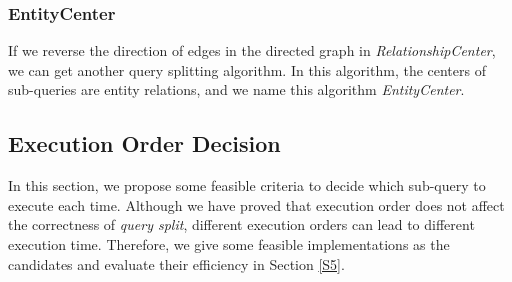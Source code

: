     
    \subsubsection{EntityCenter} \label{S413}
        If we reverse the direction of edges in the directed graph in \textit{RelationshipCenter}, we can get another query splitting algorithm. In this algorithm, the centers of sub-queries are entity relations, and we name this algorithm \textit{EntityCenter}.
    
\subsection{Execution Order Decision} \label{S42}
    In this section, we propose some feasible criteria to decide which sub-query to execute each time. Although we have proved that execution order does not affect the correctness of \textit{query split}, different execution orders can lead to different execution time. Therefore, we give some feasible implementations as the candidates and evaluate their efficiency in Section \ref{S5}.
